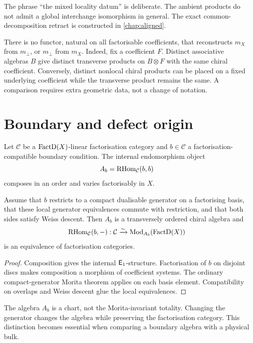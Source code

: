 The phrase ``the mixed locality datum'' is deliberate.  The ambient products do not admit a global interchange isomorphism in general.  The exact common-decomposition retract is constructed in \cref{chap:aligned}.

\begin{nogobox}[title={No-go theorem 1: one associative direction does not generate the other}]
There is no functor, natural on all factorisable coefficients, that reconstructs \(m_X\) from \(m_\perp\), or \(m_\perp\) from \(m_X\).  Indeed, fix a coefficient \(F\).  Distinct associative algebras \(B\) give distinct transverse products on \(B\otimes F\) with the same chiral coefficient.  Conversely, distinct nonlocal chiral products can be placed on a fixed underlying coefficient while the transverse product remains the same.  A comparison requires extra geometric data, not a change of notation.
\end{nogobox}

\section{Boundary and defect origin}
Let \(\mathcal C\) be a \(\operatorname{FactD}(X)\)-linear factorisation category and \(b\in\mathcal C\) a factorisation-compatible boundary condition.  The internal endomorphism object
\[
 A_b=\operatorname{RHom}_{\mathcal C}(b,b)
\]
composes in an order and varies factorisably in \(X\).

\begin{theorem}\label{thm:factorisation-morita}
Assume that \(b\) restricts to a compact dualisable generator on a factorising basis, that these local generator equivalences commute with restriction, and that both sides satisfy Weiss descent.  Then \(A_b\) is a transversely ordered chiral algebra and
\[
 \operatorname{RHom}_{\mathcal C}(b,-):\mathcal C\xrightarrow{\sim}
 \operatorname{Mod}_{A_b}(\operatorname{FactD}(X))
\]
is an equivalence of factorisation categories.
\end{theorem}
\begin{proof}
Composition gives the internal \(\mathsf E_1\)-structure.  Factorisation of \(b\) on disjoint discs makes composition a morphism of coefficient systems.  The ordinary compact-generator Morita theorem applies on each basis element.  Compatibility on overlaps and Weiss descent glue the local equivalences.
\end{proof}

The algebra \(A_b\) is a chart, not the Morita-invariant totality.  Changing the generator changes the algebra while preserving the factorisation category.  This distinction becomes essential when comparing a boundary algebra with a physical bulk.


